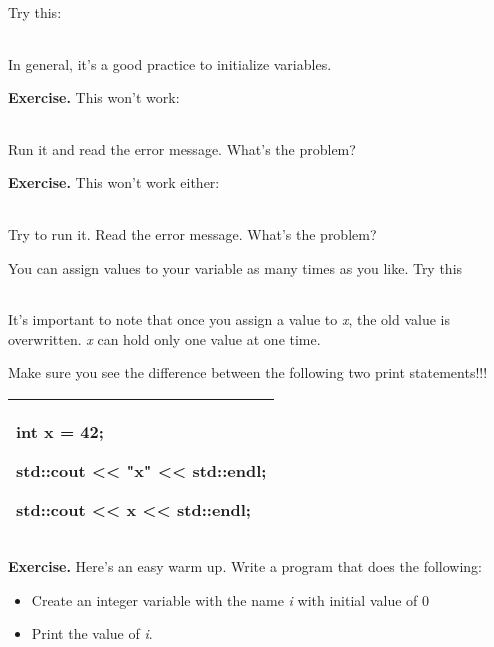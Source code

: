 \documentclass[
]{article}
\providecommand{\tightlist}{%
  \setlength{\itemsep}{0pt}\setlength{\parskip}{0pt}}
\begin{document}
Try this:

\begin{longtable}[]{@{}@{}}
\toprule
\endhead
\bottomrule
\end{longtable}

In general, it's a good practice to initialize variables.

\textbf{Exercise.} This won't work:

\begin{longtable}[]{@{}@{}}
\toprule
\endhead
\bottomrule
\end{longtable}

Run it and read the error message. What's the problem?

\textbf{Exercise.} This won't work either:

\begin{longtable}[]{@{}@{}}
\toprule
\endhead
\bottomrule
\end{longtable}

Try to run it. Read the error message. What's the problem?

You can assign values to your variable as many times as you like. Try
this

\begin{longtable}[]{@{}@{}}
\toprule
\endhead
\bottomrule
\end{longtable}

It's important to note that once you assign a value to \emph{x}, the old
value is overwritten. \emph{x} can hold only one value at one time.

Make sure you see the difference between the following two print
statements!!!

\begin{longtable}[]{@{}l@{}}
\toprule
\endhead
\begin{minipage}[t]{0.97\columnwidth}\raggedright
int x = 42;

std::cout \textless\textless{} "x" \textless\textless{} std::endl;

std::cout \textless\textless{} x \textless\textless{} std::endl;\strut
\end{minipage}\tabularnewline
\bottomrule
\end{longtable}

\textbf{Exercise.} Here's an easy warm up. Write a program that does the
following:

\begin{itemize}
\tightlist
\item
  Create an integer variable with the name \emph{i} with initial value
  of 0
\item
  Print the value of \emph{i}.
\end{itemize}
\end{document}
